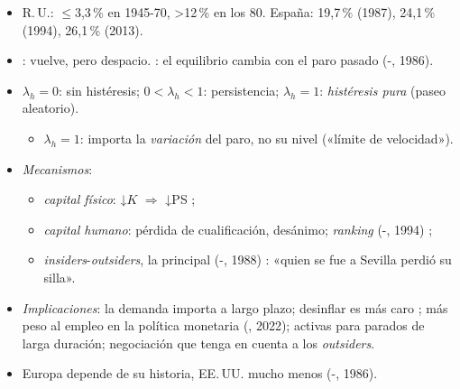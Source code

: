 \documentclass{article}
\begin{document}
\begin{columnas}
\begin{itemize}
\item R.\,U.: $\leq$3,3\,\% en 1945-70, >12\,\% en los 80. España: 19,7\,\% (1987), 24,1\,\% (1994), 26,1\,\% (2013).
\item {}: vuelve, pero despacio. : el equilibrio cambia con el paro pasado (-, 1986).
\end{itemize}
\begin{itemize}
\item $\lambda_h=0$: sin histéresis; $0<\lambda_h<1$: persistencia; $\lambda_h=1$: \emph{histéresis pura} (paseo aleatorio).
  \begin{itemize}
  \item $\lambda_h=1$: importa la \emph{variación} del paro, no su nivel («límite de velocidad»).
  \end{itemize}
\item \emph{Mecanismos}:
  \begin{itemize}
  \item \emph{capital físico}: ↓$K$ $\Rightarrow$ ↓PS ;
  \item \emph{capital humano}: pérdida de cualificación, desánimo; \emph{ranking} (-, 1994) ;
  \item \emph{insiders}-\emph{outsiders}, la principal (-, 1988) : «quien se fue a Sevilla perdió su silla».
  \end{itemize}
\end{itemize}
\begin{itemize}
\item \emph{Implicaciones}: la demanda importa a largo plazo; desinflar es más caro ; más peso al empleo en la política monetaria (, 2022); activas para parados de larga duración; negociación que tenga en cuenta a los \emph{outsiders}.
\end{itemize}
\begin{itemize}
\item Europa depende de su historia, EE.\,UU. mucho menos (-, 1986).

\end{itemize}
\end{columnas}
\end{document}
